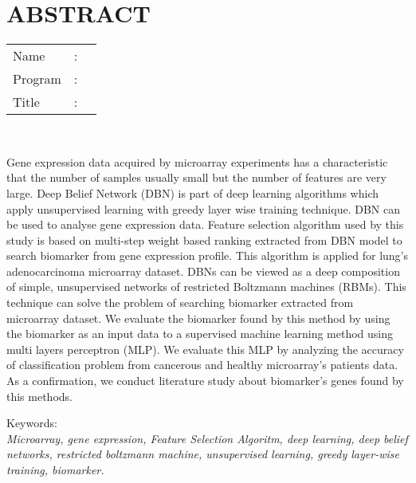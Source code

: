 %
%
%

\chapter*{ABSTRACT}

\vspace*{0.2cm}

\noindent \begin{tabular}{l l p{11.0cm}}
	Name&: & \penulis \\
	Program&: & \program \\
	Title&: & \judulInggris \\
\end{tabular} \\ 

\vspace*{0.5cm}

\noindent 
Gene expression data acquired by microarray experiments has a characteristic that the number of samples usually small but the number of features are very large. Deep Belief Network (DBN) is part of deep learning algorithms which apply unsupervised learning with greedy layer wise training technique. DBN can be used to analyse gene expression data.  Feature selection algorithm used by this study is based on multi-step weight based ranking extracted from DBN model to search biomarker from gene expression profile. This algorithm is applied for lung’s adenocarcinoma microarray dataset. DBNs can be viewed as a deep composition of simple, unsupervised networks of restricted Boltzmann machines (RBMs). This technique can solve the problem of searching biomarker extracted from microarray dataset. We evaluate the biomarker found by this method by using the biomarker as an input data to a supervised machine learning method using multi layers perceptron (MLP). We evaluate this MLP by analyzing the accuracy of classification problem from cancerous and healthy microarray’s patients data. As a confirmation, we conduct literature study about biomarker’s genes found by this methods.
\vspace*{0.2cm}

\noindent Keywords: \\ 
\noindent \textit{Microarray, gene expression, Feature Selection Algoritm, deep learning, deep belief networks, restricted boltzmann machine, unsupervised learning, greedy layer-wise training, biomarker.}

\newpage